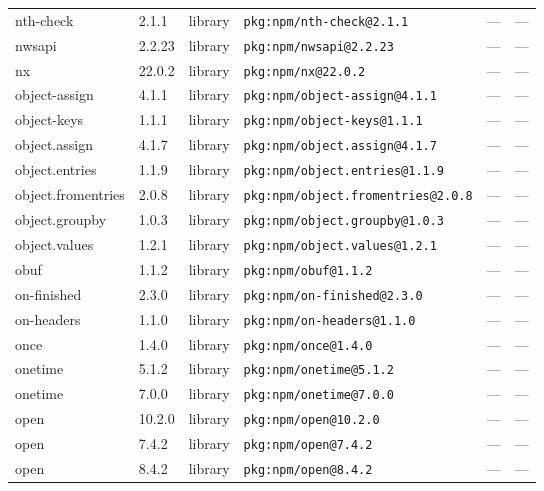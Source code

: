 \documentclass[11pt,a4paper]{article}
\begin{document}
\begin{longtable}{|p{4cm}|p{2cm}|p{1.6cm}|p{5cm}|p{1.5cm}|p{3.5cm}|}
\raggedright nth-check & 2.1.1 & library & \small\texttt{pkg:npm/nth-check@2.1.1} & — & \small — \\
\raggedright nwsapi & 2.2.23 & library & \small\texttt{pkg:npm/nwsapi@2.2.23} & — & \small — \\
\raggedright nx & 22.0.2 & library & \small\texttt{pkg:npm/nx@22.0.2} & — & \small — \\
\raggedright object-assign & 4.1.1 & library & \small\texttt{pkg:npm/object-assign@4.1.1} & — & \small — \\
\raggedright object-keys & 1.1.1 & library & \small\texttt{pkg:npm/object-keys@1.1.1} & — & \small — \\
\raggedright object.assign & 4.1.7 & library & \small\texttt{pkg:npm/object.assign@4.1.7} & — & \small — \\
\raggedright object.entries & 1.1.9 & library & \small\texttt{pkg:npm/object.entries@1.1.9} & — & \small — \\
\raggedright object.fromentries & 2.0.8 & library & \small\texttt{pkg:npm/object.fromentries@2.0.8} & — & \small — \\
\raggedright object.groupby & 1.0.3 & library & \small\texttt{pkg:npm/object.groupby@1.0.3} & — & \small — \\
\raggedright object.values & 1.2.1 & library & \small\texttt{pkg:npm/object.values@1.2.1} & — & \small — \\
\raggedright obuf & 1.1.2 & library & \small\texttt{pkg:npm/obuf@1.1.2} & — & \small — \\
\raggedright on-finished & 2.3.0 & library & \small\texttt{pkg:npm/on-finished@2.3.0} & — & \small — \\
\raggedright on-headers & 1.1.0 & library & \small\texttt{pkg:npm/on-headers@1.1.0} & — & \small — \\
\raggedright once & 1.4.0 & library & \small\texttt{pkg:npm/once@1.4.0} & — & \small — \\
\raggedright onetime & 5.1.2 & library & \small\texttt{pkg:npm/onetime@5.1.2} & — & \small — \\
\raggedright onetime & 7.0.0 & library & \small\texttt{pkg:npm/onetime@7.0.0} & — & \small — \\
\raggedright open & 10.2.0 & library & \small\texttt{pkg:npm/open@10.2.0} & — & \small — \\
\raggedright open & 7.4.2 & library & \small\texttt{pkg:npm/open@7.4.2} & — & \small — \\
\raggedright open & 8.4.2 & library & \small\texttt{pkg:npm/open@8.4.2} & — & \small — \\

\end{longtable}
\end{document}
